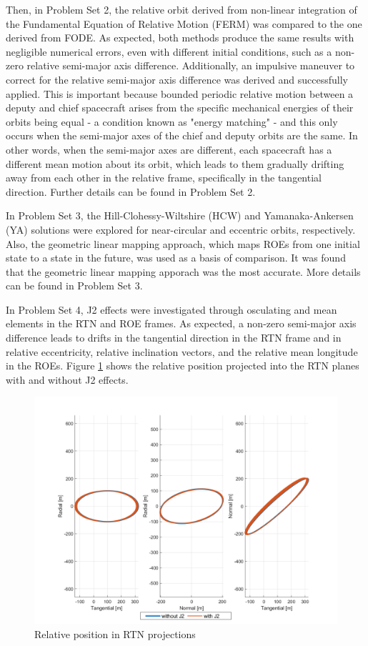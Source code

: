 Then, in Problem Set 2, the relative orbit derived from non-linear integration of the Fundamental Equation of Relative Motion (FERM) was compared to the one derived from FODE. As expected, both methods produce the same results with negligible numerical errors, even with different initial conditions, such as a non-zero relative semi-major axis difference. Additionally, an impulsive maneuver to correct for the relative semi-major axis difference was derived and successfully applied. This is important because bounded periodic relative motion between a deputy and chief spacecraft arises from the specific mechanical energies of their orbits being equal - a condition known as "energy matching" - and this only occurs when the semi-major axes of the chief and deputy orbits are the same. In other words, when the semi-major axes are different, each spacecraft has a different mean motion about its orbit, which leads to them gradually drifting away from each other in the relative frame, specifically in the tangential direction. Further details can be found in Problem Set 2. 

In Problem Set 3, the Hill-Clohessy-Wiltshire (HCW) and Yamanaka-Ankersen (YA) solutions were explored for near-circular and eccentric orbits, respectively. Also, the geometric linear mapping approach, which maps ROEs from one initial state to a state in the future, was used as a basis of comparison. It was found that the geometric linear mapping apporach was the most accurate. More details can be found in Problem Set 3.

In Problem Set 4, J2 effects were investigated through osculating and mean elements in the RTN and ROE frames. As expected, a non-zero semi-major axis difference leads to drifts in the tangential direction in the RTN frame and in relative eccentricity, relative inclination vectors, and the relative mean longitude in the ROEs. Figure \ref{fig:RTN_projections_summary} shows the relative position projected into the RTN planes with and without J2 effects.

\begin{figure}[H]
    \centering
    \includegraphics[width=0.75\linewidth]{sim/figures/PS4/RTN_projections_SV2.png}
    \caption{Relative position in RTN projections}
    \label{fig:RTN_projections_summary}
\end{figure}

